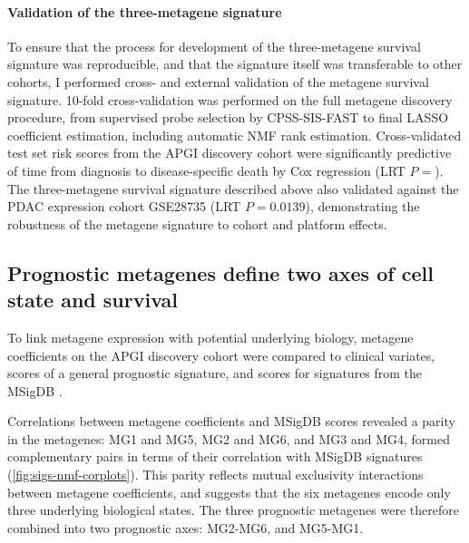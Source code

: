 \documentclass[dissertation.tex]{subfiles}
\begin{document}
\paragraph{Validation of the three-metagene signature}
To ensure that the process for development of the three-metagene survival signature was reproducible, and that the signature itself was transferable to other cohorts, I performed cross- and external validation of the metagene survival signature.  10-fold cross-validation was performed on the full metagene discovery procedure, from supervised probe selection by \gls{CPSS}-\gls{SIS}-\gls{FAST} to final \gls{LASSO} coefficient estimation, including automatic \gls{NMF} rank estimation.  Cross-validated test set risk scores from the \gls{APGI} discovery cohort were significantly predictive of time from diagnosis to disease-specific death by Cox regression (LRT $P = $).  The three-metagene survival signature described above also validated against the \gls{PDAC} expression cohort GSE28735 \cite{Zhang2013} (LRT $P = 0.0139$), demonstrating the robustness of the metagene signature to cohort and platform effects.  

\subsection{Prognostic metagenes define two axes of cell state and survival}
To link metagene expression with potential underlying biology, metagene coefficients on the \gls{APGI} discovery cohort were compared to clinical variates, scores of a general prognostic signature, and scores for signatures from the \gls{MSigDB} \cite{Subramanian2005}.

Correlations between metagene coefficients and \gls{MSigDB} scores revealed a parity in the metagenes: MG1 and MG5, MG2 and MG6, and MG3 and MG4, formed complementary pairs in terms of their correlation with \gls{MSigDB} signatures (\cref{fig:sigs-nmf-corplots}).  This parity reflects mutual exclusivity interactions between metagene coefficients, and suggests that the six metagenes encode only three underlying biological states.  The three prognostic metagenes were therefore combined into two prognostic axes: MG2-MG6, and MG5-MG1.
\end{document}
